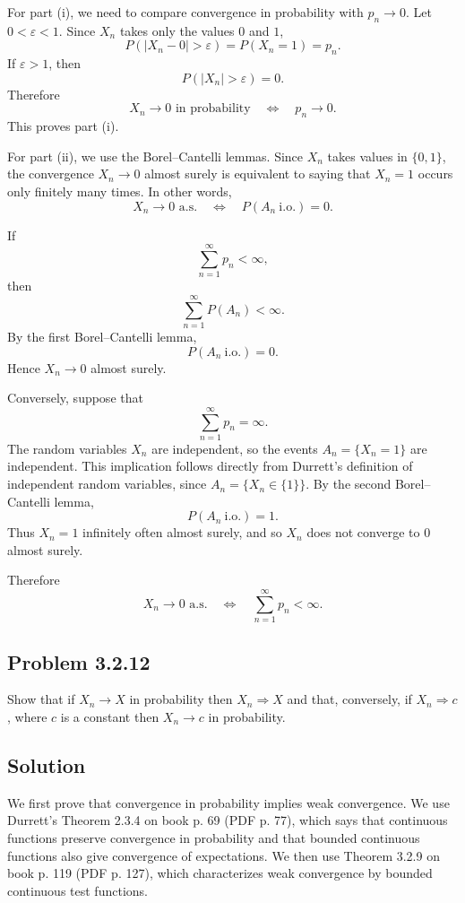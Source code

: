 \documentclass[a4paper,12pt,openany]{article}
\theoremstyle{plain}
\theoremstyle{definition}
\begin{document}
\medskip

For part (i), we need to compare convergence in probability with $p_n\to 0$. Let $0<\varepsilon<1$. Since $X_n$ takes only the values $0$ and $1$,
\[
P(|X_n-0|>\varepsilon)
=
P(X_n=1)
=
p_n.
\]
If $\varepsilon>1$, then
\[
P(|X_n|>\varepsilon)=0.
\]
Therefore
\[
X_n\to 0 \text{ in probability}
\quad\Longleftrightarrow\quad
p_n\to 0.
\]
This proves part (i).

\medskip

For part (ii), we use the Borel--Cantelli lemmas. Since $X_n$ takes values in $\{0,1\}$, the convergence $X_n\to 0$ almost surely is equivalent to saying that $X_n=1$ occurs only finitely many times. In other words,
\[
X_n\to 0 \text{ a.s.}
\quad\Longleftrightarrow\quad
P(A_n\ \text{i.o.})=0.
\]

If
\[
\sum_{n=1}^{\infty}p_n<\infty,
\]
then
\[
\sum_{n=1}^{\infty}P(A_n)<\infty.
\]
By the first Borel--Cantelli lemma,
\[
P(A_n\ \text{i.o.})=0.
\]
Hence $X_n\to 0$ almost surely.

\medskip

Conversely, suppose that
\[
\sum_{n=1}^{\infty}p_n=\infty.
\]
The random variables $X_n$ are independent, so the events $A_n=\{X_n=1\}$ are independent. This implication follows directly from Durrett's definition of independent random variables, since $A_n=\{X_n\in\{1\}\}$. By the second Borel--Cantelli lemma,
\[
P(A_n\ \text{i.o.})=1.
\]
Thus $X_n=1$ infinitely often almost surely, and so $X_n$ does not converge to $0$ almost surely.

\medskip

Therefore
\[
X_n\to 0 \text{ a.s.}
\quad\Longleftrightarrow\quad
\sum_{n=1}^{\infty}p_n<\infty.
\]

\subsection*{Problem 3.2.12}

Show that if $X_n \to X$ in probability then $X_n \Rightarrow X$ and that, conversely, if $X_n \Rightarrow c$, where $c$ is a constant then $X_n \to c$ in probability.

\subsection*{Solution}

We first prove that convergence in probability implies weak convergence. We use Durrett's Theorem 2.3.4 on book p. 69 (PDF p. 77), which says that continuous functions preserve convergence in probability and that bounded continuous functions also give convergence of expectations. We then use Theorem 3.2.9 on book p. 119 (PDF p. 127), which characterizes weak convergence by bounded continuous test functions.
\end{document}
